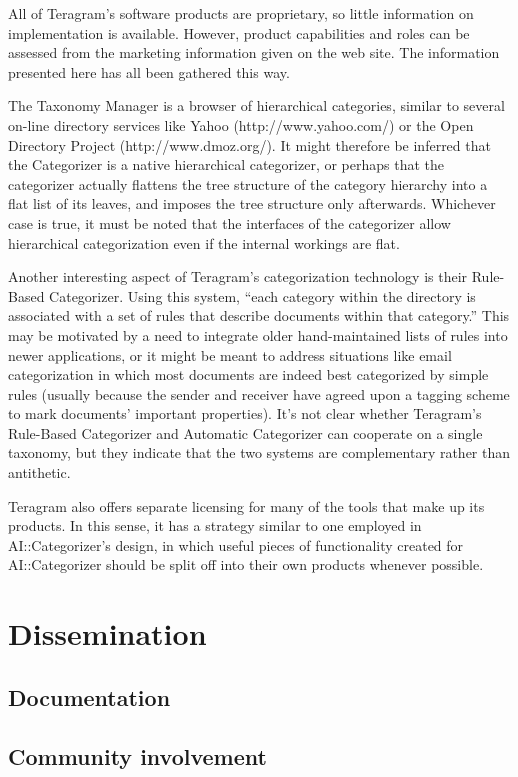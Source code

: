 \documentclass[a4paper]{report}
\begin{document}
All of Teragram's software products are proprietary, so little
information on implementation is available.  However, product
capabilities and roles can be assessed from the marketing information
given on the web site.  The information presented here has all been
gathered this way.

The Taxonomy Manager is a browser of hierarchical categories, similar
to several on-line directory services like Yahoo
(http://www.yahoo.com/) or the Open Directory Project
(http://www.dmoz.org/).  It might therefore be inferred that the
Categorizer is a native hierarchical categorizer, or perhaps that the
categorizer actually flattens the tree structure of the category
hierarchy into a flat list of its leaves, and imposes the tree
structure only afterwards.  Whichever case is true, it must be noted
that the interfaces of the categorizer allow hierarchical
categorization even if the internal workings are flat.

Another interesting aspect of Teragram's categorization technology is
their Rule-Based Categorizer.  Using this system, ``each category
within the directory is associated with a set of rules that describe
documents within that category.''  This may be motivated by a need to
integrate older hand-maintained lists of rules into newer
applications, or it might be meant to address situations like email
categorization in which most documents are indeed best categorized by
simple rules (usually because the sender and receiver have agreed upon
a tagging scheme to mark documents' important properties).  It's not
clear whether Teragram's Rule-Based Categorizer and Automatic
Categorizer can cooperate on a single taxonomy, but they indicate that
the two systems are complementary rather than antithetic.

Teragram also offers separate licensing for many of the tools that
make up its products.  In this sense, it has a strategy similar to one
employed in AI::Categorizer's design, in which useful pieces of
functionality created for AI::Categorizer should be split off into
their own products whenever possible.

\section{Dissemination}
\subsection{Documentation}
\subsection{Community involvement}
\end{document}
